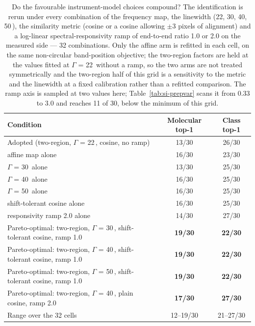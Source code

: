 \begin{table}[htbp]
\centering
\caption{Do the favourable instrument-model choices compound? The identification is rerun under every combination of the frequency map, the linewidth (22, 30, 40, 50\,\wn{}), the similarity metric (cosine or a cosine allowing $\pm$3 pixels of alignment) and a log-linear spectral-responsivity ramp of end-to-end ratio 1.0 or 2.0 on the measured side --- 32 combinations. Only the affine arm is refitted in each cell, on the same non-circular band-position objective; the two-region factors are held at the values fitted at $\Gamma$ = 22\,\wn{} without a ramp, so the two arms are not treated symmetrically and the two-region half of this grid is a sensitivity to the metric and the linewidth at a fixed calibration rather than a refitted comparison. The ramp axis is sampled at two values here; Table~\ref{tab:si-prepvar} scans it from 0.33 to 3.0 and reaches 11 of 30, below the minimum of this grid.}
\label{tab:si-jointenv}
\small
\begin{tabular}{lcc}
\toprule
Condition & Molecular top-1 & Class top-1 \\
\midrule
Adopted (two-region, $\Gamma$ = 22\,\wn{}, cosine, no ramp) & 13/30 & 26/30 \\
\midrule
affine map alone & 16/30 & 23/30 \\
$\Gamma$ = 30\,\wn{} alone & 13/30 & 25/30 \\
$\Gamma$ = 40\,\wn{} alone & 16/30 & 25/30 \\
$\Gamma$ = 50\,\wn{} alone & 16/30 & 25/30 \\
shift-tolerant cosine alone & 16/30 & 25/30 \\
responsivity ramp 2.0 alone & 14/30 & 27/30 \\
\midrule
Pareto-optimal: two-region, $\Gamma$ = 30\,\wn{}, shift-tolerant cosine, ramp 1.0 & \textbf{19/30} & \textbf{22/30} \\
Pareto-optimal: two-region, $\Gamma$ = 40\,\wn{}, shift-tolerant cosine, ramp 1.0 & \textbf{19/30} & \textbf{22/30} \\
Pareto-optimal: two-region, $\Gamma$ = 50\,\wn{}, shift-tolerant cosine, ramp 1.0 & \textbf{19/30} & \textbf{22/30} \\
Pareto-optimal: two-region, $\Gamma$ = 40\,\wn{}, plain cosine, ramp 2.0 & \textbf{17/30} & \textbf{27/30} \\
\midrule
Range over the 32 cells & 12--19/30 & 21--27/30 \\
\bottomrule
\end{tabular}


\end{table}
